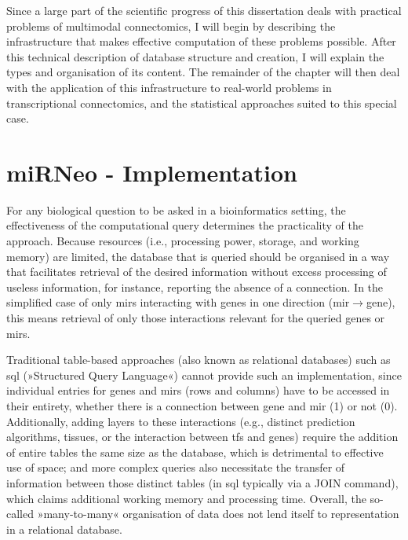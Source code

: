 Since a large part of the scientific progress of this dissertation deals with practical problems of multimodal connectomics, I will begin by describing the infrastructure that makes effective computation of these problems possible. After this technical description of database structure and creation, I will explain the types and organisation of its content. The remainder of the chapter will then deal with the application of this infrastructure to real-world problems in transcriptional connectomics, and the statistical approaches suited to this special case.


\section{miRNeo - Implementation}
For any biological question to be asked in a bioinformatics setting, the effectiveness of the computational query determines the practicality of the approach. Because resources (i.e., processing power, storage, and working memory) are limited, the database that is queried should be organised in a way that facilitates retrieval of the desired information without excess processing of useless information, for instance, reporting the absence of a connection. In the simplified case of only \acp{mir} interacting with genes in one direction (\ac{mir}$\to$gene), this means retrieval of only those interactions relevant for the queried genes or \acp{mir}. 

Traditional table-based approaches (also known as relational databases) such as \acs{sql}  (»Structured Query Language«) cannot provide such an implementation, since individual entries for genes and \acp{mir} (rows and columns) have to be accessed in their entirety, whether there is a connection between gene and \ac{mir} (1) or not (0). Additionally, adding layers to these interactions (e.g., distinct prediction algorithms, tissues, or the interaction between \acp{tf} and genes) require the addition of entire tables the same size as the database, which is detrimental to effective use of space; and more complex queries also necessitate the transfer of information between those distinct tables (in \ac{sql} typically via a \textcolor{dkblue}{JOIN} command), which claims additional working memory and processing time. Overall, the so-called »many-to-many« organisation of data does not lend itself to representation in a relational database. 

